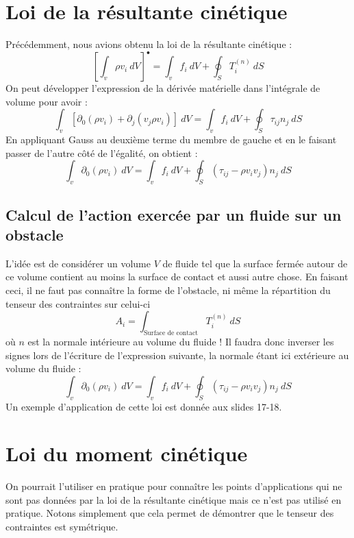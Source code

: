     

\section{Loi de la résultante cinétique}
Précédemment, nous avions obtenu la loi de la résultante cinétique :
\begin{equation}
	\left[\int_v \rho v_i\ dV\right]^\bullet = \int_v f_i\ dV + \oint_S T_i^{(n)}\ dS
\end{equation}
On peut développer l'expression de la dérivée matérielle dans l'intégrale de volume pour avoir :
\begin{equation}
	\int_v [\partial_0(\rho v_i) + \partial_j(v_j\rho v_i)]\ dV = \int_v f_i\ dV + \oint_S \tau_{ij}n_j\ dS
\end{equation}
En appliquant Gauss au deuxième terme du membre de gauche et en le faisant passer de l'autre côté 
de l'égalité, on obtient :
\begin{equation}
	\int_v \partial_0(\rho v_i)\ dV = \int_v f_i\ dV + \oint_S (\tau_{ij} - \rho v_i v_j)n_j\ dS
\end{equation}

    
\subsection{Calcul de l'action exercée par un fluide sur un obstacle}
L'idée est de considérer un volume $V$ de fluide tel que la surface fermée autour de ce volume
contient au moins la surface de contact et aussi autre chose. En faisant ceci, il ne faut pas
connaître la forme de l'obstacle, ni même la répartition du tenseur des contraintes sur celui-ci 
\begin{equation}
	A_i = \int_{\text{Surface de contact}} T_i^{(n)}\ dS
\end{equation}
où $n$ est la normale intérieure au volume du fluide ! Il faudra donc inverser les signes lors
de l'écriture de l'expression suivante, la normale étant ici extérieure au volume du fluide :
\begin{equation}
	\int_v \partial_0(\rho v_i)\ dV = \int_v f_i\ dV + \oint_S (\tau_{ij} - \rho v_i v_j)n_j\ dS
\end{equation}
Un exemple d'application de cette loi est donnée aux slides 17-18.




\section{Loi du moment cinétique}
On pourrait l'utiliser en pratique pour connaître les points d'applications qui ne sont pas données
par la loi de la résultante cinétique mais ce n'est pas utilisé en pratique. Notons simplement que
cela permet de démontrer que le tenseur des contraintes est symétrique.


